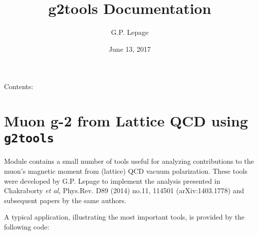 \documentclass[letterpaper,10pt,english]{sphinxmanual}
\title{g2tools Documentation}
\date{June 13, 2017}
\author{G.P. Lepage}
\begin{document}
\maketitle
\tableofcontents
{}\label{index::doc}


Contents:


\chapter{Muon g-2 from Lattice QCD using \texttt{g2tools}}
\label{overview:g2tools-documentation}\label{overview:muon-g-2-from-lattice-qcd-using-g2tools}\label{overview::doc}
Module {\hyperref[g2tools:module-g2tools]{\emph{}}} contains a small number of tools useful for analyzing
contributions to the muon's magnetic moment from (lattice) QCD vacuum
polarization. These tools were developed by G.P. Lepage to implement the
analysis presented in Chakraborty \emph{et al}, Phys.Rev. D89 (2014) no.11, 114501
(arXiv:1403.1778) and subsequent papers by the same authors.

A typical application, illustrating the most important tools, is
provided by the following code:
\end{document}
